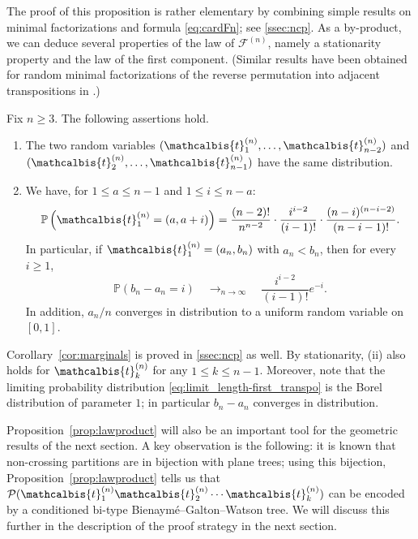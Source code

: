 \documentclass[AHL,XML,longabstracts,Unicode]{cedram}
\def\PPP{\mathcal P}
\def\tb{\mathcalbis{t}}
\renewcommand\Pr[1]{\mathbb{P}\left(#1\right)}
\begin{document}
The proof of this proposition is rather elementary by combining simple results on minimal
factorizations and formula \eqref{eq:cardFn}; see \cref{ssec:ncp}.
As a by-product, we can deduce several properties of the law of $ \mathscr{F}^{(n)}$,
namely a stationarity property and the law of the first component.
(Similar results have been obtained for random minimal factorizations of the reverse permutation
into adjacent transpositions in \cite{AHRV07}.)
\begin{corollary}\label{cor:marginals} Fix $n \geq 3$. The following assertions hold.
\begin{enumerate}
\item[(i)] The two random variables $(\tb_{1}^{(n)}, \ldots, \tb_{n-2}^{(n)})$ and $(\tb_{2}^{(n)}, \ldots, \tb^{(n)}_{n-1})$ have the same distribution.
\item[(ii)] We have, for $1 \leq a  \leq n-1$ and $ 1 \leq i \leq n-a$:
\begin{equation}
\label{eq:lawT1}\Pr{\tb_{1}^{(n)}=(a,a+i)}= \frac{(n-2)!}{n^{n-2}} \cdot \frac{i^{i-2}}{(i-1)!} \cdot \frac{(n-i)^{(n-i-2)}} {(n-i-1)!}.	
\end{equation}
In particular,  if $\tb_{1}^{(n)}=(a_{n},b_{n})$  with $a_{n}<b_{n}$, then for every $i \geq 1$,
\begin{equation}
  \Pr{b_{n}-a_{n}=i}  \quad \mathop{\longrightarrow}_{n \rightarrow \infty} \quad  \frac{i^{i-2}}{(i-1)!} e^{-i}.
  \label{eq:limit_length-first_transpo}
\end{equation}
In addition, $a_{n}/n$ converges in distribution to a uniform random variable on $[0,1]$.
\end{enumerate}	
\end{corollary}
Corollary~\ref{cor:marginals} is proved in \cref{ssec:ncp} as well.
By stationarity, (ii) also holds for $\tb_{k}^{(n)}$ for any $1 \le k \le n-1$.
Moreover, note that the limiting probability distribution
\eqref{eq:limit_length-first_transpo} is the Borel distribution of parameter $1$;
in particular $b_n-a_n$ converges in distribution.

Proposition~\ref{prop:lawproduct} will also be an important tool for the geometric  results of the next section.
A key observation is the following: it is known that non-crossing partitions are in bijection with plane trees;
using this bijection, Proposition~\ref{prop:lawproduct} tells us that
$\PPP(\tb_{1}^{(n)} \tb_{2}^{(n)} \cdots \tb_{k}^{(n)})$ can be encoded by
a conditioned
bi-type Bienaym\'e--Galton--Watson tree.
We will discuss this further in the description of the proof strategy in the next section.
\end{document}
